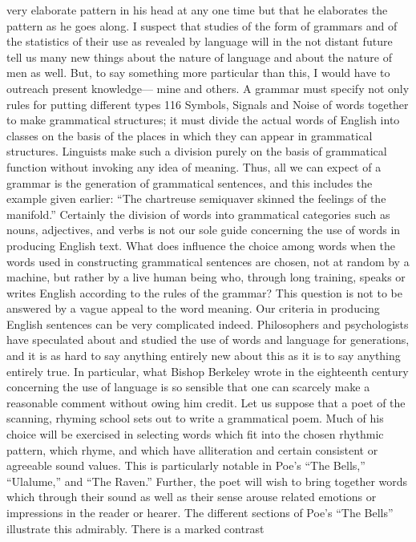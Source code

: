 {{{very elaborate pattern in his head at any one time but that he
elaborates the pattern as he goes along.
I suspect that studies of the form of grammars and of the statistics
of their use as revealed by language will in the not distant
future tell us many new things about the nature of language and
about the nature of men as well. But, to say something more particular
than this, I would have to outreach present knowledge—
mine and others.
A grammar must specify not only rules for putting different types
116
Symbols, Signals and Noise
of words together to make grammatical structures; it must divide
the actual words of English into classes on the basis of the places
in which they can appear in grammatical structures. Linguists make
such a division purely on the basis of grammatical function without
invoking any idea of meaning. Thus, all we can expect of a
grammar is the generation of grammatical sentences, and this includes
the example given earlier: “The chartreuse semiquaver
skinned the feelings of the manifold.” Certainly the division of
words into grammatical categories such as nouns, adjectives, and
verbs is not our sole guide concerning the use of words in producing
English text.
What does influence the choice among words when the words
used in constructing grammatical sentences are chosen, not at
random by a machine, but rather by a live human being who,
through long training, speaks or writes English according to the
rules of the grammar? This question is not to be answered by a
vague appeal to the word meaning. Our criteria in producing English
sentences can be very complicated indeed. Philosophers and
psychologists have speculated about and studied the use of words
and language for generations, and it is as hard to say anything entirely
new about this as it is to say anything entirely true. In particular,
what Bishop Berkeley wrote in the eighteenth century
concerning the use of language is so sensible that one can scarcely
make a reasonable comment without owing him credit.
Let us suppose that a poet of the scanning, rhyming school sets
out to write a grammatical poem. Much of his choice will be exercised
in selecting words which fit into the chosen rhythmic pattern,
which rhyme, and which have alliteration and certain consistent
or agreeable sound values. This is particularly notable in Poe’s
“The Bells,” “Ulalume,” and “The Raven.”
Further, the poet will wish to bring together words which through
their sound as well as their sense arouse related emotions or impressions
in the reader or hearer. The different sections of Poe’s
“The Bells” illustrate this admirably. There is a marked contrast
}}}
